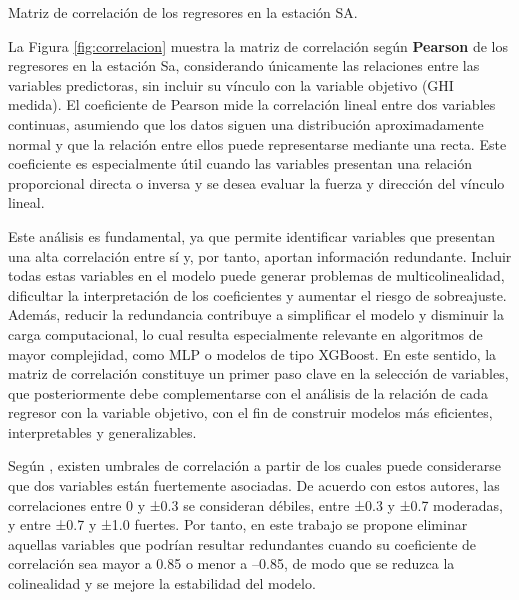 \documentclass[letterpaper,12pt, twoside]{report}
\providecommand{\DIFdeltex}[1]{{\protect\color{red} \scriptsize #1}} %
\providecommand{\DIFdelFL}[1]{\DIFdel{#1}} %
\providecommand{\DIFdel}[1]{\texorpdfstring{\DIFdeltex{#1}}{}} %
\begin{document}
{%
\DIFdelFL{Matriz de correlación de los regresores en la estación SA.}}

\DIFdel{La Figura \ref{fig:correlacion} muestra la matriz de correlación según \textbf{Pearson} de los regresores en la estación Sa, considerando únicamente las relaciones entre las variables predictoras, sin incluir su vínculo con la variable objetivo (GHI medida).
El coeficiente de Pearson mide la correlación lineal entre dos variables continuas, asumiendo que los datos siguen una distribución aproximadamente normal y que la relación entre ellos puede representarse mediante una recta. Este coeficiente es especialmente útil cuando las variables presentan una relación proporcional directa o inversa y se desea evaluar la fuerza y dirección del vínculo lineal.}%

\DIFdel{Este análisis es fundamental, ya que permite identificar variables que presentan una alta correlación entre sí y, por tanto, aportan información redundante. Incluir todas estas variables en el modelo puede generar problemas de multicolinealidad, dificultar la interpretación de los coeficientes y aumentar el riesgo de sobreajuste. Además, reducir la redundancia contribuye a simplificar el modelo y disminuir la carga computacional, lo cual resulta especialmente relevante en algoritmos de mayor complejidad, como MLP o modelos de tipo XGBoost. En este sentido, la matriz de correlación constituye un primer paso clave en la selección de variables, que posteriormente debe complementarse con el análisis de la relación de cada regresor con la variable objetivo, con el fin de construir modelos más eficientes, interpretables y generalizables.}%

\DIFdel{Según \citet{Geher2016}, existen umbrales de correlación a partir de los cuales puede considerarse que dos variables están fuertemente asociadas. De acuerdo con estos autores, las correlaciones entre 0 y ±0.3 se consideran débiles, entre ±0.3 y ±0.7 moderadas, y entre ±0.7 y ±1.0 fuertes. Por tanto, en este trabajo se propone eliminar aquellas variables que podrían resultar redundantes cuando su coeficiente de correlación sea mayor a 0.85 o menor a –0.85, de modo que se reduzca la colinealidad y se mejore la estabilidad del modelo.
}%
\end{document}
